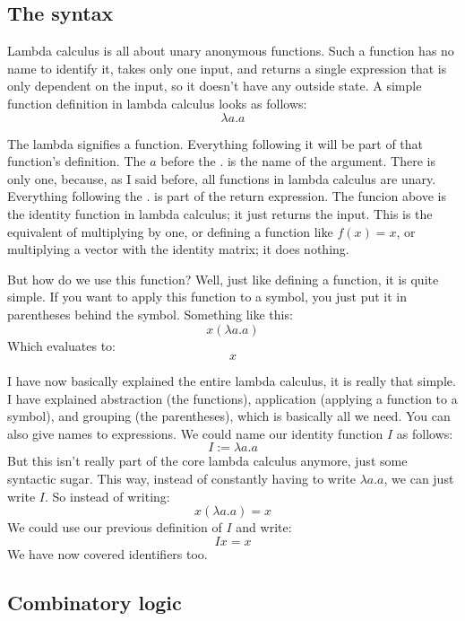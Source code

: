 \documentclass[a4paper, 11pt]{article}
\begin{document}

\subsection{The syntax}

Lambda calculus is all about unary anonymous functions. Such a function has no
name to identify it, takes only one input, and returns a single expression that
is only dependent on the input, so it doesn't have any outside state. A simple
function definition in lambda calculus looks as follows:
\[\lambda a.a\]

The lambda signifies a function. Everything following it will be part of that
function's definition. The \(a\) before the \(.\) is the name of the argument.
There is only one, because, as I said before, all functions in lambda calculus
are unary. Everything following the \(.\) is part of the return expression. The
funcion above is the identity function in lambda calculus; it just returns the
input. This is the equivalent of multiplying by one, or defining a function
like \(f(x)=x\), or multiplying a vector with the identity matrix; it does
nothing.

But how do we use this function? Well, just like defining a function, it is
quite simple. If you want to apply this function to a symbol, you just put it
in parentheses behind the symbol. Something like this:
\[x(\lambda a.a)\]
Which evaluates to:
\[x\]

I have now basically explained the entire lambda calculus, it is really that
simple. I have explained abstraction (the functions), application (applying a
function to a symbol), and grouping (the parentheses), which is basically all
we need. You can also give names to expressions. We could name our identity
function \(I\) as follows: \[I:=\lambda a.a\] But this isn't really part of the
core lambda calculus anymore, just some syntactic sugar. This way, instead of
constantly having to write \(\lambda a.a\), we can just write \(I\). So instead
of writing:
\[x (\lambda a.a)=x\]
We could use our previous definition of \(I\) and write:
\[Ix=x\]
We have now covered identifiers too.

\subsection{Combinatory logic}

\end{document}
